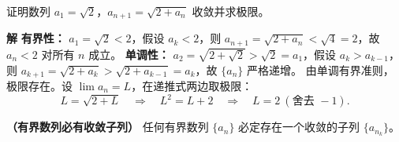 \documentclass{ctexart}
\newenvironment{custom}[1]{\par\noindent \textbf{#1}\quad}{\par\vspace{1em}}
\begin{document}
\begin{example}[重要例子]
证明数列 \(a_1 = \sqrt{2}\)，\(a_{n+1} = \sqrt{2 + a_n}\) 收敛并求极限。
\end{example}
\begin{custom}{解}
\textbf{有界性：} \(a_1 = \sqrt{2} < 2\)，假设 \(a_k < 2\)，则 \(a_{n+1} = \sqrt{2 + a_n} < \sqrt{4} = 2\)，故 \(a_n < 2\) 对所有 \(n\) 成立。
\textbf{单调性：} \(a_2 = \sqrt{2+\sqrt{2}} > \sqrt{2} = a_1\)，假设 \(a_k > a_{k-1}\)，则 \(a_{k+1} = \sqrt{2 + a_k} > \sqrt{2 + a_{k-1}} = a_k\)，故 \(\{a_n\}\) 严格递增。
由单调有界准则，极限存在。设 \(\lim a_n = L\)，在递推式两边取极限：
\[
L = \sqrt{2 + L} \quad\Longrightarrow\quad L^2 = L + 2 \quad\Longrightarrow\quad L = 2\ (\text{舍去 } -1).
\]
\end{custom}

\begin{theorem}
\textbf{（有界数列必有收敛子列）}
任何有界数列 \(\{a_n\}\) 必定存在一个收敛的子列 \(\{a_{n_k}\}\)。
\end{theorem}
\end{document}
